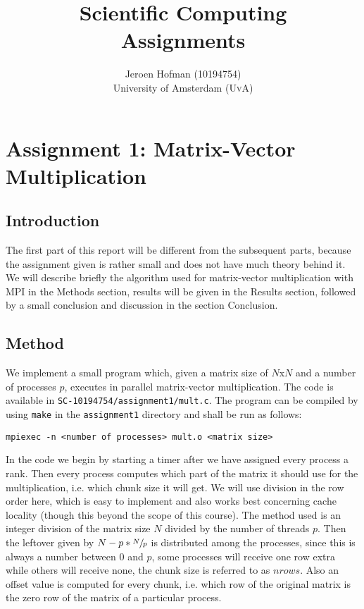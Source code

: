 \documentclass[11pt,a4paper,onecolumn]{article}
\author{Jeroen Hofman (10194754)  \\[15pt] University of Amsterdam (\textsc{UvA})}
\title{Scientific Computing\\
  Assignments \\
		}
\begin{document}
\maketitle
\captionsetup{width=0.8\textwidth}
\thispagestyle{empty}
\graphicspath{{/home/jhofman/Desktop/SC/assignment2/}{/home/jhofman/Desktop/SC/assignment3/}{/home/jhofman/Desktop/SC/assignment4/}}

\newpage
\tableofcontents
\newpage

\section{Assignment 1: Matrix-Vector Multiplication}

\subsection{Introduction}
The first part of this report will be different from the subsequent parts, because the assignment given is rather small and does not have much theory behind it. We will describe briefly the algorithm used for matrix-vector multiplication with MPI in the Methods section, results will be given in the Results section, followed by a small conclusion and discussion in the section Conclusion.

\subsection{Method}
We implement a small program which, given a matrix size of $N$x$N$ and a number of processes $p$, executes in parallel matrix-vector multiplication. The code is available in \texttt{SC-10194754/assignment1/mult.c}. The program can be compiled by using \texttt{make} in the \texttt{assignment1} directory and shall be run as follows:\\
\begin{center}
  \texttt{mpiexec -n <number of processes> mult.o <matrix size>}
\end{center}
In the code we begin by starting a timer after we have assigned every process a rank. Then every process computes which part of the matrix it should use for the multiplication, i.e. which chunk size it will get. We will use division in the row order here, which is easy to implement and also works best concerning cache locality (though this beyond the scope of this course). The method used is an integer division of the matrix size $N$ divided by the number of threads $p$. Then the leftover given by $N - p*\sfrac{N}{p}$ is distributed among the processes, since this is always a number between 0 and $p$, some processes will receive one row extra while others will receive none, the chunk size is referred to as $nrows$. Also an offset value is computed for every chunk, i.e. which row of the original matrix is the zero row of the matrix of a particular process.
\end{document}
